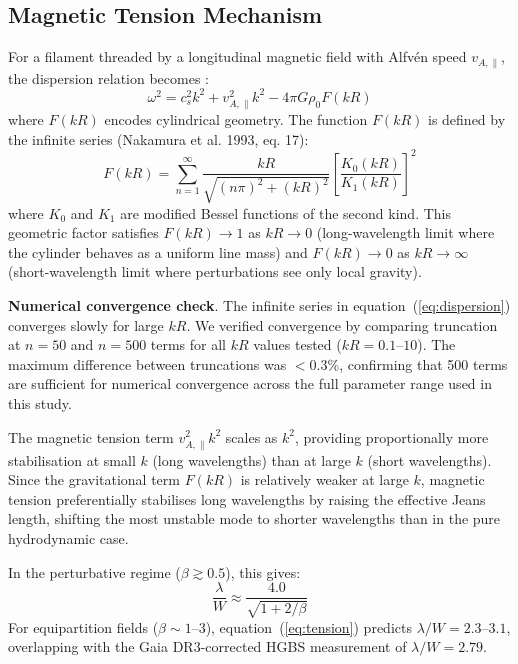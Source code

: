 \documentclass[twocolumn,longtitle,usenatbib]{mnras}
\begin{document}
\subsection{Magnetic Tension Mechanism}

For a filament threaded by a longitudinal magnetic field with Alfv\'en speed $v_{A,\parallel}$, the dispersion relation becomes \citep{Nakamura1993}:
\begin{equation}
\omega^2 = c_s^2 k^2 + v_{A,\parallel}^2 k^2 - 4\pi G\rho_0 F(kR)
\label{eq:dispersion}
\end{equation}
where $F(kR)$ encodes cylindrical geometry. The function $F(kR)$ is defined by the infinite series (Nakamura et al. 1993, eq. 17):
\begin{equation}
F(kR) = \sum_{n=1}^{\infty} \frac{kR}{\sqrt{(n\pi)^2 + (kR)^2}} \left[\frac{K_0(kR)}{K_1(kR)}\right]^2
\end{equation}
where $K_0$ and $K_1$ are modified Bessel functions of the second kind. This geometric factor satisfies $F(kR) \to 1$ as $kR \to 0$ (long-wavelength limit where the cylinder behaves as a uniform line mass) and $F(kR) \to 0$ as $kR \to \infty$ (short-wavelength limit where perturbations see only local gravity).

\textbf{Numerical convergence check}. The infinite series in equation~(\ref{eq:dispersion}) converges slowly for large $kR$. We verified convergence by comparing truncation at $n = 50$ and $n = 500$ terms for all $kR$ values tested ($kR = 0.1$--$10$). The maximum difference between truncations was $<0.3\%$, confirming that 500 terms are sufficient for numerical convergence across the full parameter range used in this study.

The magnetic tension term $v_{A,\parallel}^2 k^2$ scales as $k^2$, providing proportionally more stabilisation at small $k$ (long wavelengths) than at large $k$ (short wavelengths). Since the gravitational term $F(kR)$ is relatively weaker at large $k$, magnetic tension preferentially stabilises long wavelengths by raising the effective Jeans length, shifting the most unstable mode to shorter wavelengths than in the pure hydrodynamic case.

In the perturbative regime ($\beta \gtrsim 0.5$), this gives:
\begin{equation}
\frac{\lambda}{W} \approx \frac{4.0}{\sqrt{1 + 2/\beta}}
\label{eq:tension}
\end{equation}
For equipartition fields ($\beta \sim 1$--$3$), equation~(\ref{eq:tension}) predicts $\lambda/W = 2.3$--$3.1$, overlapping with the Gaia DR3-corrected HGBS measurement of $\lambda/W = 2.79$.
\end{document}

